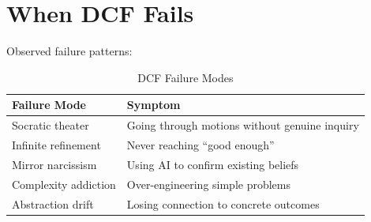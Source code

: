 \section{When DCF Fails}

Observed failure patterns:

\begin{table}[H]
\centering
\begin{tabular}{ll}
\toprule
\textbf{Failure Mode} & \textbf{Symptom} \\
\midrule
Socratic theater & Going through motions without genuine inquiry \\
Infinite refinement & Never reaching ``good enough'' \\
Mirror narcissism & Using AI to confirm existing beliefs \\
Complexity addiction & Over-engineering simple problems \\
Abstraction drift & Losing connection to concrete outcomes \\
\bottomrule
\end{tabular}
\caption{DCF Failure Modes}
\end{table}

